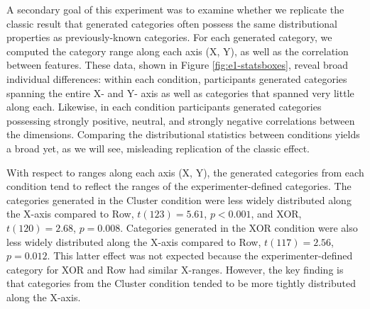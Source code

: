 \documentclass[12pt]{article}
\begin{document}
\begin{flushleft}
A secondary goal of this experiment was to examine whether we replicate the classic result that generated categories often possess the same distributional properties as previously-known categories. For each generated category, we computed the category range along each axis (X, Y), as well as the correlation between features. These data, shown in Figure \ref{fig:e1-statsboxes}, reveal broad individual differences: within each condition, participants generated categories spanning the entire X- and Y- axis as well as categories that spanned very little along each. Likewise, in each condition participants generated categories possessing strongly positive, neutral, and strongly negative correlations between the dimensions. Comparing the distributional statistics between conditions yields a broad yet, as we will see, misleading replication of the classic effect. 

With respect to ranges along each axis (X, Y), the generated categories from each condition tend to reflect the ranges of the experimenter-defined categories. The categories generated in the Cluster condition were less widely distributed along the X-axis compared to Row, $t(123) = 5.61$, $p < 0.001$, and XOR, $t(120) = 2.68$, $p = 0.008$. Categories generated in the XOR condition were also less widely distributed along the X-axis compared to Row, $t(117) = 2.56$, $p = 0.012$. This latter effect was not expected because the experimenter-defined category for XOR and Row had similar X-ranges. However, the key finding is that categories from the Cluster condition tended to be more tightly distributed along the X-axis.


\end{flushleft}
\end{document}
